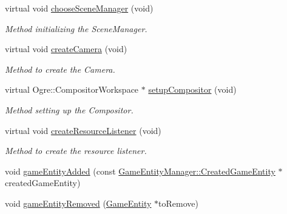 \begin{DoxyCompactItemize}
virtual void \hyperlink{class_common_1_1_graphics_system_a6fc846f42d2011cfdeb465aa9ef44b20}{choose\+Scene\+Manager} (void)
\begin{DoxyCompactList}\small\item\em Method initializing the Scene\+Manager. \end{DoxyCompactList}\item 
\mbox{\label{class_common_1_1_graphics_system_a84373ea7cef6f794831d98ef60227abb}} 
virtual void \hyperlink{class_common_1_1_graphics_system_a84373ea7cef6f794831d98ef60227abb}{create\+Camera} (void)
\begin{DoxyCompactList}\small\item\em Method to create the Camera. \end{DoxyCompactList}\item 
\mbox{\label{class_common_1_1_graphics_system_a36c3548e669676eb5ad328d947454e81}} 
virtual Ogre\+::\+Compositor\+Workspace $\ast$ \hyperlink{class_common_1_1_graphics_system_a36c3548e669676eb5ad328d947454e81}{setup\+Compositor} (void)
\begin{DoxyCompactList}\small\item\em Method setting up the Compositor. \end{DoxyCompactList}\item 
\mbox{\label{class_common_1_1_graphics_system_a0c9ba8a9470920fe8dd3d19ad85698e0}} 
virtual void \hyperlink{class_common_1_1_graphics_system_a0c9ba8a9470920fe8dd3d19ad85698e0}{create\+Resource\+Listener} (void)
\begin{DoxyCompactList}\small\item\em Method to create the resource listener. \end{DoxyCompactList}\item 
void \hyperlink{class_common_1_1_graphics_system_aaaac50f8c51dad1746ef48aaf87cad8d}{game\+Entity\+Added} (const \hyperlink{struct_common_1_1_game_entity_manager_1_1_created_game_entity}{Game\+Entity\+Manager\+::\+Created\+Game\+Entity} $\ast$created\+Game\+Entity)
\item 
void \hyperlink{class_common_1_1_graphics_system_ad10ea4363b7d49f6a43bee937b031559}{game\+Entity\+Removed} (\hyperlink{struct_common_1_1_game_entity}{Game\+Entity} $\ast$to\+Remove)
\end{DoxyCompactItemize}
